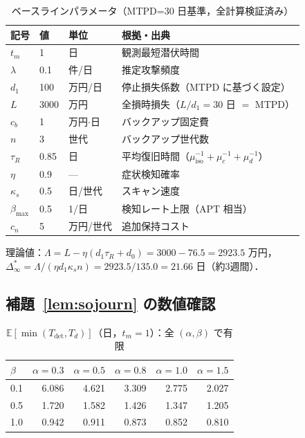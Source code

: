 \documentclass[12pt,a4paper]{article}
\theoremstyle{plain}
\theoremstyle{definition}
\theoremstyle{remark}
\newcommand{\E}{\mathbb{E}}
\newcommand{\Tdet}{T_{\mathrm{det}}}
\newcommand{\Dinf}{\Delta^{*}_{\infty}}
\begin{document}
\begin{table}[h]
\centering\small
\caption{ベースラインパラメータ（MTPD=30 日基準，全計算検証済み）}
\label{tab:params}
\begin{tabular}{@{}lll p{58mm}@{}}
\toprule
記号 & 値 & 単位 & 根拠・出典 \\
\midrule
$t_m$ & 1 & 日 & 観測最短潜伏時間~\cite{mandiant2023} \\
$\lambda$ & 0.1 & 件/日 & 推定攻撃頻度 \\
$d_1$ & 100 & 万円/日 & 停止損失係数（MTPD に基づく設定）\\
$L$ & 3000 & 万円 & 全損時損失（$L/d_1=30$ 日 $=$ MTPD）\\
$c_b$ & 1 & 万円$\cdot$日 & バックアップ固定費 \\
$n$ & 3 & 世代 & バックアップ世代数 \\
$\tau_R$ & 0.85 & 日 & 平均復旧時間（$\mu_{\mathrm{iso}}^{-1}+\mu_c^{-1}+\mu_d^{-1}$）\\
$\eta$ & 0.9 & --- & 症状検知確率 \\
$\kappa_s$ & 0.5 & 日/世代 & スキャン速度 \\
$\beta_{\max}$ & 0.5 & 1/日 & 検知レート上限（APT 相当）\\
$c_n$ & 5 & 万円/世代 & 追加保持コスト \\
\bottomrule
\end{tabular}
\end{table}

理論値：$\Lambda=L-\eta(d_1\tau_R+d_0)=3000-76.5=2923.5$ 万円，
$\Dinf=\Lambda/(\eta d_1\kappa_s n)=2923.5/135.0=21.66$ 日（約3週間）．

\subsection{補題~\ref{lem:sojourn} の数値確認}

\begin{table}[h]
\centering
\caption{$\E[\min(\Tdet,T_d)]$（日，$t_m=1$）：全 $(\alpha,\beta)$ で有限}
\label{tab:sojourn}
\begin{tabular}{@{}lrrrrr@{}}
\toprule
$\beta$ & $\alpha=0.3$ & $\alpha=0.5$ & $\alpha=0.8$ & $\alpha=1.0$ & $\alpha=1.5$ \\
\midrule
0.1 & 6.086 & 4.621 & 3.309 & 2.775 & 2.027 \\
0.5 & 1.720 & 1.582 & 1.426 & 1.347 & 1.205 \\
1.0 & 0.942 & 0.911 & 0.873 & 0.852 & 0.810 \\
\bottomrule
\end{tabular}
\end{table}
\end{document}
